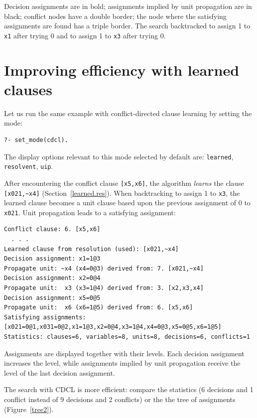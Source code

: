 \documentclass[11pt]{report}
\newcommand*{\p}[1]{\textup{\texttt{#1}}}
\begin{document}
Decision assignments are in bold; assignments implied by unit
propagation are in black; conflict nodes have a double border; the node
where the satisfying assignments are found has a triple border. The
search backtracked to assign 1 to \p{x1} after trying 0 and to assign 1
to \p{x3} after trying 0.

\section{Improving efficiency with learned clauses}

Let us run the same example with conflict-directed clause learning by
setting the mode:

\begin{verbatim}
?- set_mode(cdcl).
\end{verbatim}

The display options relevant to this mode selected by default are:
\p{learned}, \p{resolvent}, \p{uip}.

After encountering the conflict clause \verb+[x5,x6]+, the algorithm
\emph{learns} the clause \verb+[x021,~x4]+ (Section~\ref{learned.res}).
When backtracking to assign 1 to \p{x3}, the learned clause becomes a
unit clause based upon the previous assignment of 0 to \p{x021}. Unit
propagation leads to a satisfying assignment:

\begin{verbatim}
Conflict clause: 6. [x5,x6]
  . . .
Learned clause from resolution (used): [x021,~x4]
Decision assignment: x1=1@3
Propagate unit: ~x4 (x4=0@3) derived from: 7. [x021,~x4]
Decision assignment: x2=0@4
Propagate unit:  x3 (x3=1@4) derived from: 3. [x2,x3,x4]
Decision assignment: x5=0@5
Propagate unit:  x6 (x6=1@5) derived from: 6. [x5,x6]
Satisfying assignments:
[x021=0@1,x031=0@2,x1=1@3,x2=0@4,x3=1@4,x4=0@3,x5=0@5,x6=1@5]
Statistics: clauses=6, variables=8, units=8, decisions=6, conflicts=1
\end{verbatim}
Assignments are displayed together with their levels. Each decision
assignment increases the level, while assignments implied by unit
propagation receive the level of the last decision assignment. 

The search with CDCL is more efficient: compare the statistics (6
decisions and 1 conflict instead of 9 decisions and 2 conflicts) or the
the tree of assignments (Figure~\ref{tree2}).
\end{document}
